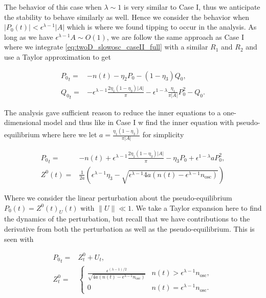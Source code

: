 The behavior of this case when $\lambda\sim 1$ is very similar to Case I, thus we anticipate the stability to behave similarly as well. Hence we consider the behavior when $|P_0(t)|<\epsilon^{\lambda-1}|A|$ which is where we found tipping to occur in the analysis. As long as we have $\epsilon^{\lambda-1}A\sim O(1)$, we are follow the same approach as Case I where we integrate \eqref{eq:twoD_slowosc_caseII_full} with a similar $R_1$ and $R_2$ and use a Taylor approximation to get

\begin{equation*}
\begin{aligned}
{P_0}_t =& - n(t)-\eta_2 P_0 -(1-\eta_3)Q_0,\\
{Q_0}_t =& -\epsilon^{\lambda-1}\frac{2\eta_1(1-\eta_3)|A|}{\pi}-\epsilon^{1-\lambda}\frac{\eta_1}{\pi|A|}P_0^2- Q_0.
\end{aligned}
\end{equation*}

The analysis gave sufficient reason to reduce the inner equations to a one-dimensional model and thus like in Case I w find the inner equation with pseudo-equilibrium where here we let $a=\frac{\eta_1(1-\eta_3)}{\pi|A|}$ for simplicity

\begin{equation*}
\begin{aligned}
{P_0}_t =& -n(t)+\epsilon^{\lambda-1}\frac{2\eta_1(1-\eta_3)|A|}{\pi}-\eta_3 P_0+\epsilon^{1-\lambda}aP_0^2,\\
Z^0(t) =& \frac{1}{2a}\left(\epsilon^{\lambda-1}\eta_3-\sqrt{\epsilon^{\lambda-1}4a(n(t)-\epsilon^{\lambda-1}n_{\text{osc}})}\right)
\end{aligned}
\end{equation*}

Where we consider the linear perturbation about the pseudo-equilibrium $P_0(t)= Z^0(t)_U(t)$ with $\lVert U\rVert \ll 1$. We take a Taylor expansion here to find the dynamics of the perturbation, but recall that we have contributions to the derivative from both the perturbation as well as the pseudo-equilibrium. This is seen with

\begin{equation}
\begin{aligned}
{P_0}_t =& Z^0_t+U_t,\\
Z^0_t=&\begin{cases}
\frac{\epsilon^{(\lambda-1)/2}}{\sqrt{4a(n(t)-\epsilon^{\lambda-1}n_{\text{osc}})}} & n(t)>\epsilon^{\lambda-1}n_{\text{osc}},\\
0 & n(t)=\epsilon^{\lambda-1}n_{\text{osc}}.
\end{cases}
\end{aligned}
\end{equation}

